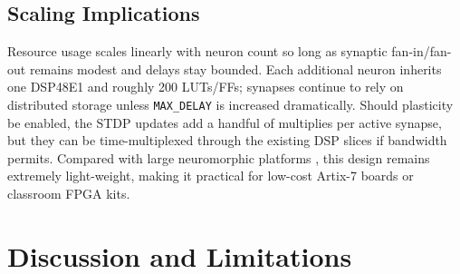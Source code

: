 \documentclass[10pt,onecolumn]{IEEEtran}
\begin{document}
\subsection{Scaling Implications}
Resource usage scales linearly with neuron count so long as synaptic fan-in/fan-out remains modest and delays stay bounded. Each additional neuron inherits one DSP48E1 and roughly 200 LUTs/FFs; synapses continue to rely on distributed storage unless \texttt{MAX\_DELAY} is increased dramatically. Should plasticity be enabled, the STDP updates add a handful of multiplies per active synapse, but they can be time-multiplexed through the existing DSP slices if bandwidth permits. Compared with large neuromorphic platforms \cite{Furber2014,Merolla2014,Davies2018}, this design remains extremely light-weight, making it practical for low-cost Artix-7 boards or classroom FPGA kits.

\section{Discussion and Limitations}
\label{sec:discussion}

\noindent
\begin{minipage}{\linewidth}
  \setlength{\fboxsep}{8pt}
  \setlength{\fboxrule}{0.6pt}
\end{minipage}
\end{document}
